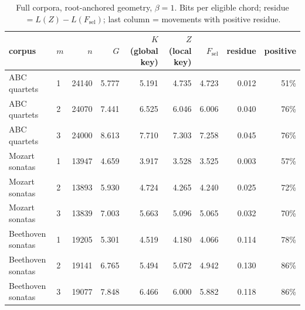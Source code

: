 \documentclass[11pt]{article}
\begin{document}
\begin{table}[t]\centering\small
\caption{Full corpora, root-anchored geometry, $\beta=1$. Bits per eligible chord; residue $=L(Z)-L(F_{\mathrm{sel}})$; last column = movements with positive residue.}\label{tab:full}
\begin{tabular}{llrrrrrrr}\toprule corpus & $m$ & $n$ & $G$ & $K$ (global key) & $Z$ (local key) & $F_{\mathrm{sel}}$ & residue & positive \\ \midrule
ABC quartets & 1 & 24140 & 5.777 & 5.191 & 4.735 & 4.723 & 0.012 & 51\% \\
ABC quartets & 2 & 24070 & 7.441 & 6.525 & 6.046 & 6.006 & 0.040 & 76\% \\
ABC quartets & 3 & 24000 & 8.613 & 7.710 & 7.303 & 7.258 & 0.045 & 76\% \\
Mozart sonatas & 1 & 13947 & 4.659 & 3.917 & 3.528 & 3.525 & 0.003 & 57\% \\
Mozart sonatas & 2 & 13893 & 5.930 & 4.724 & 4.265 & 4.240 & 0.025 & 72\% \\
Mozart sonatas & 3 & 13839 & 7.003 & 5.663 & 5.096 & 5.065 & 0.032 & 70\% \\
Beethoven sonatas & 1 & 19205 & 5.301 & 4.519 & 4.180 & 4.066 & 0.114 & 78\% \\
Beethoven sonatas & 2 & 19141 & 6.765 & 5.494 & 5.072 & 4.942 & 0.130 & 86\% \\
Beethoven sonatas & 3 & 19077 & 7.848 & 6.466 & 6.000 & 5.882 & 0.118 & 86\% \\
\bottomrule\end{tabular}\end{table}
\end{document}
